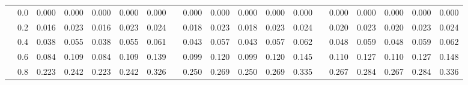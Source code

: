 \begin{table}
{\begin{tabular}{llccccccccccccccccc}
 & 0.0 & \cellcolor[HTML]{74ADD1}0.000 & \cellcolor[HTML]{74ADD1}0.000 & \cellcolor[HTML]{74ADD1}0.000 & \cellcolor[HTML]{74ADD1}0.000 & \cellcolor[HTML]{74ADD1}0.000 & & \cellcolor[HTML]{74ADD1}0.000 & \cellcolor[HTML]{74ADD1}0.000 & \cellcolor[HTML]{74ADD1}0.000 & \cellcolor[HTML]{74ADD1}0.000 & \cellcolor[HTML]{74ADD1}0.000 & & \cellcolor[HTML]{74ADD1}0.000 & \cellcolor[HTML]{74ADD1}0.000 & \cellcolor[HTML]{74ADD1}0.000 & \cellcolor[HTML]{74ADD1}0.000 & \cellcolor[HTML]{74ADD1}0.000 \\
 & 0.2 & \cellcolor[HTML]{B1DCEB}0.016 & \cellcolor[HTML]{C3E4F0}0.023 & \cellcolor[HTML]{B1DCEB}0.016 & \cellcolor[HTML]{C3E4F0}0.023 & \cellcolor[HTML]{C5E6F0}0.024 & & \cellcolor[HTML]{B6DEEC}0.018 & \cellcolor[HTML]{C2E4EF}0.023 & \cellcolor[HTML]{B6DEEC}0.018 & \cellcolor[HTML]{C2E4EF}0.023 & \cellcolor[HTML]{C3E5F0}0.024 & & \cellcolor[HTML]{B9E0ED}0.020 & \cellcolor[HTML]{C2E4F0}0.023 & \cellcolor[HTML]{B9E0ED}0.020 & \cellcolor[HTML]{C2E4F0}0.023 & \cellcolor[HTML]{C3E5F0}0.024 \\
 & 0.4 & \cellcolor[HTML]{DFF2F8}0.038 & \cellcolor[HTML]{EEF8E1}0.055 & \cellcolor[HTML]{DFF2F8}0.038 & \cellcolor[HTML]{EEF8E1}0.055 & \cellcolor[HTML]{F3FAD9}0.061 & & \cellcolor[HTML]{E3F4F3}0.043 & \cellcolor[HTML]{EFF8DF}0.057 & \cellcolor[HTML]{E3F4F3}0.043 & \cellcolor[HTML]{EFF8DF}0.057 & \cellcolor[HTML]{F2F9DA}0.062 & & \cellcolor[HTML]{E8F6EB}0.048 & \cellcolor[HTML]{F0F8DE}0.059 & \cellcolor[HTML]{E8F6EB}0.048 & \cellcolor[HTML]{F0F8DE}0.059 & \cellcolor[HTML]{F2F9DA}0.062 \\
 & 0.6 & \cellcolor[HTML]{FFFFC0}0.084 & \cellcolor[HTML]{FFF4AE}0.109 & \cellcolor[HTML]{FFFFC0}0.084 & \cellcolor[HTML]{FFF4AE}0.109 & \cellcolor[HTML]{FFE99E}0.139 & & \cellcolor[HTML]{FFFAB7}0.099 & \cellcolor[HTML]{FFF1AA}0.120 & \cellcolor[HTML]{FFF9B7}0.099 & \cellcolor[HTML]{FFF1AA}0.120 & \cellcolor[HTML]{FFE89D}0.145 & & \cellcolor[HTML]{FFF5B0}0.110 & \cellcolor[HTML]{FFEFA6}0.127 & \cellcolor[HTML]{FFF5B0}0.110 & \cellcolor[HTML]{FFEFA6}0.127 & \cellcolor[HTML]{FFE89C}0.148 \\
 & 0.8 & \cellcolor[HTML]{FFCC7C}0.223 & \cellcolor[HTML]{FEC577}0.242 & \cellcolor[HTML]{FFCC7C}0.223 & \cellcolor[HTML]{FEC577}0.242 & \cellcolor[HTML]{FDAE61}0.326 & & \cellcolor[HTML]{FEC576}0.250 & \cellcolor[HTML]{FEBF71}0.269 & \cellcolor[HTML]{FEC576}0.250 & \cellcolor[HTML]{FEBF71}0.269 & \cellcolor[HTML]{FDAE61}0.335 & & \cellcolor[HTML]{FEC072}0.267 & \cellcolor[HTML]{FEBB6D}0.284 & \cellcolor[HTML]{FEC072}0.267 & \cellcolor[HTML]{FEBB6D}0.284 & \cellcolor[HTML]{FDAE61}0.336 \\

\end{tabular}}
\end{table}
